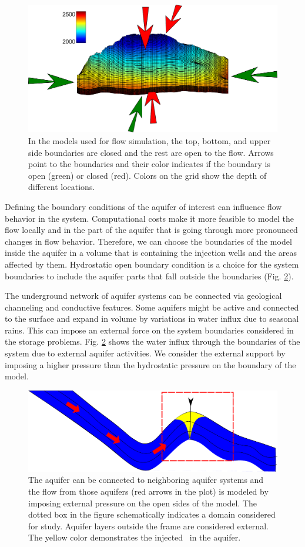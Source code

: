 \begin{figure}
 \centering{}
 \includegraphics[width=0.8\linewidth]{./figurer/boundaries.pdf}
 \caption{In the models used for flow simulation, the top, bottom, and upper side boundaries are closed and the rest are open to the flow. Arrows point to the boundaries and their color indicates if the boundary is open (green) or closed (red). Colors on the grid show the depth of different locations.}
 \label{fig:BDRY}
\end{figure}

Defining the boundary conditions of the aquifer of interest can influence flow behavior in the system. Computational costs make it more feasible to model the flow locally and in the
part of the aquifer that is going through more pronounced changes in flow
behavior. Therefore, we can choose the boundaries of the model inside the aquifer
in a volume that is containing the injection wells and the areas affected by
them. Hydrostatic open boundary condition is a choice for the system boundaries
to include the aquifer parts that fall outside the boundaries (Fig.
\ref{fig:bkw}).

The underground network of aquifer systems can be connected via geological
channeling and conductive features. Some aquifers might be active and connected
to the surface and expand in volume by variations in water influx due to 
seasonal rains. This can impose an external force on the system boundaries
considered in the storage problems. Fig. \ref{fig:bkw} shows the water influx
through the boundaries of the system due to external aquifer activities. We
consider the external support by imposing a higher pressure than the hydrostatic
pressure on the boundary of the model.

\begin{figure}[thb]
  \centering
  \includegraphics[width=0.65 \linewidth]{./figurer/bkw} 
  \caption{The aquifer can be connected to neighboring aquifer systems and the flow from those aquifers (red arrows in the plot) is modeled by imposing external pressure on the open sides of the model. The dotted box in the figure schematically indicates a domain considered for study. Aquifer layers outside the frame are considered external. The yellow color demonstrates the injected \coo\ in the aquifer.}
  \label{fig:bkw}
%
\end{figure}


